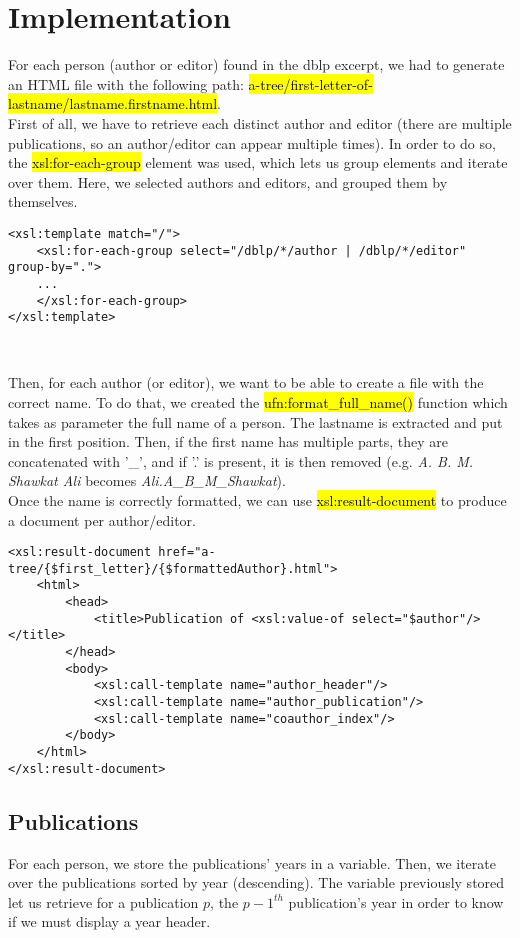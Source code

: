 \section{Implementation}

For each person (author or editor) found in the dblp excerpt, we had to generate
an HTML file with the following path:
\hl{a-tree/first-letter-of-lastname/lastname.firstname.html}.\\

First of all, we have to retrieve each distinct author and editor (there are
multiple publications, so an author/editor can appear multiple times). In order
to do so, the \hl{xsl:for-each-group} element was used, which lets us group
elements and iterate over them. Here, we selected authors and editors, and
grouped them by themselves.\\

\begin{lstlisting}
<xsl:template match="/">
    <xsl:for-each-group select="/dblp/*/author | /dblp/*/editor" group-by=".">
    ...
    </xsl:for-each-group>
</xsl:template>
\end{lstlisting}
\

Then, for each author (or editor), we want to be able to create a file with the
correct name. To do that, we created the \hl{ufn:format\_full\_name()} function
which takes as parameter the full name of a person. The lastname is extracted
and put in the first position. Then, if the first name has multiple parts, they
are concatenated with '\_', and if '.' is present, it is then removed (e.g.
\emph{A. B. M. Shawkat Ali} becomes \emph{Ali.A\_B\_M\_Shawkat}).\\

Once the name is correctly formatted, we can use \hl{xsl:result-document} to
produce a document per author/editor.\\

\begin{lstlisting}
<xsl:result-document href="a-tree/{$first_letter}/{$formattedAuthor}.html">
    <html>
        <head>
            <title>Publication of <xsl:value-of select="$author"/></title>
        </head>
        <body>
            <xsl:call-template name="author_header"/>
            <xsl:call-template name="author_publication"/>
            <xsl:call-template name="coauthor_index"/>
        </body>
    </html>
</xsl:result-document>
\end{lstlisting}

\subsection{Publications}
For each person, we store the publications' years in a variable. Then, we iterate
over the publications sorted by year (descending). The variable previously stored let us
retrieve for a publication $p$, the ${p-1}^{th}$ publication's year in order to
know if we must display a year header.\\


